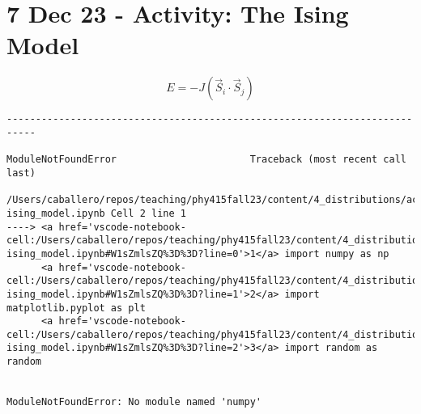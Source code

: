 \section{7 Dec 23 - Activity: The Ising
Model}\label{dec-23---activity-the-ising-model}

\[E = -J\left(\vec{S}_i\cdot\vec{S}_j\right)\]

\begin{Shaded}
\begin{Highlighting}[]
\end{Highlighting}
\end{Shaded}

\begin{verbatim}
---------------------------------------------------------------------------

ModuleNotFoundError                       Traceback (most recent call last)

/Users/caballero/repos/teaching/phy415fall23/content/4_distributions/activity-ising_model.ipynb Cell 2 line 1
----> <a href='vscode-notebook-cell:/Users/caballero/repos/teaching/phy415fall23/content/4_distributions/activity-ising_model.ipynb#W1sZmlsZQ%3D%3D?line=0'>1</a> import numpy as np
      <a href='vscode-notebook-cell:/Users/caballero/repos/teaching/phy415fall23/content/4_distributions/activity-ising_model.ipynb#W1sZmlsZQ%3D%3D?line=1'>2</a> import matplotlib.pyplot as plt
      <a href='vscode-notebook-cell:/Users/caballero/repos/teaching/phy415fall23/content/4_distributions/activity-ising_model.ipynb#W1sZmlsZQ%3D%3D?line=2'>3</a> import random as random


ModuleNotFoundError: No module named 'numpy'
\end{verbatim}

